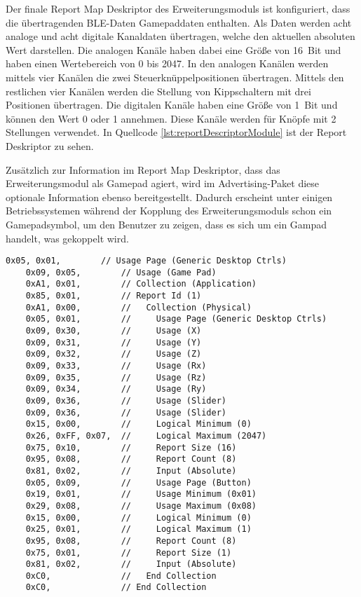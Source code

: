Der finale Report Map Deskriptor des Erweiterungsmoduls ist konfiguriert, dass die übertragenden \ac{BLE}-Daten Gamepaddaten enthalten. Als Daten werden acht analoge und acht digitale Kanaldaten übertragen, welche den aktuellen absoluten Wert darstellen. Die analogen Kanäle haben dabei eine Größe von 16~Bit und haben einen Wertebereich von 0 bis 2047. In den analogen Kanälen werden mittels vier Kanälen die zwei Steuerknüppelpositionen übertragen. Mittels den restlichen vier Kanälen werden die Stellung von Kippschaltern mit drei Positionen übertragen. Die digitalen Kanäle haben eine Größe von 1~Bit und können den Wert 0 oder 1 annehmen. Diese Kanäle werden für Knöpfe mit 2 Stellungen verwendet. In Quellcode \ref{lst:reportDescriptorModule} ist der Report Deskriptor zu sehen.

Zusätzlich zur Information im Report Map Deskriptor, dass das Erweiterungsmodul als Gamepad agiert, wird im Advertising-Paket diese optionale Information ebenso bereitgestellt. Dadurch erscheint unter einigen Betriebssystemen während der Kopplung des Erweiterungsmoduls schon ein Gamepadsymbol, um den Benutzer zu zeigen, dass es sich um ein Gampad handelt, was gekoppelt wird.

\begin{lstlisting}[caption=Report Map Deskriptor des Erweiterungsmoduls, label={lst:reportDescriptorModule}, style=generalStyle]
    0x05, 0x01,        // Usage Page (Generic Desktop Ctrls)
    0x09, 0x05,        // Usage (Game Pad)
    0xA1, 0x01,        // Collection (Application)
    0x85, 0x01,        // Report Id (1)
    0xA1, 0x00,        //   Collection (Physical)
    0x05, 0x01,        //     Usage Page (Generic Desktop Ctrls)
    0x09, 0x30,        //     Usage (X)
    0x09, 0x31,        //     Usage (Y)
    0x09, 0x32,        //     Usage (Z)
    0x09, 0x33,        //     Usage (Rx)
    0x09, 0x35,        //     Usage (Rz)
    0x09, 0x34,        //     Usage (Ry)
    0x09, 0x36,        //     Usage (Slider)
    0x09, 0x36,        //     Usage (Slider)
    0x15, 0x00,        //     Logical Minimum (0)
    0x26, 0xFF, 0x07,  //     Logical Maximum (2047)
    0x75, 0x10,        //     Report Size (16)
    0x95, 0x08,        //     Report Count (8)
    0x81, 0x02,        //     Input (Absolute)
    0x05, 0x09,        //     Usage Page (Button)
    0x19, 0x01,        //     Usage Minimum (0x01)
    0x29, 0x08,        //     Usage Maximum (0x08)
    0x15, 0x00,        //     Logical Minimum (0)
    0x25, 0x01,        //     Logical Maximum (1)
    0x95, 0x08,        //     Report Count (8)
    0x75, 0x01,        //     Report Size (1)
    0x81, 0x02,        //     Input (Absolute)
    0xC0,              //   End Collection
    0xC0,              // End Collection
\end{lstlisting}

